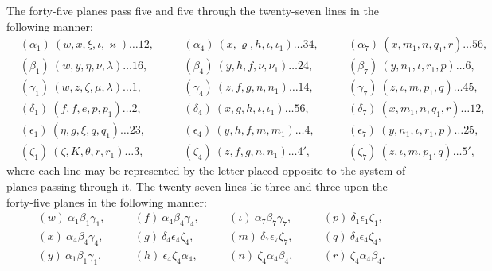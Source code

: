 \documentclass[11pt,a4paper]{book}
\begin{document}
The forty-five planes pass five and five through the twenty-seven lines in the following manner:
\begin{align*}
&(\alpha_{1})\ (w, x, \xi, \iota, \varkappa) \ldots 12, \quad &&(\alpha_{4})\ (x, \varrho, h, \iota, \iota_{1}) \ldots 34, \quad &&(\alpha_{7})\ (x, m_{1}, n, q_{1}, r) \ldots 56, \\
&(\beta_{1})\ (w, y, \eta, \nu, \lambda) \ldots 16, \quad &&(\beta_{4})\ (y, h, f, \nu, \nu_{1}) \ldots 24, \quad &&(\beta_{7})\ (y, n_{1}, \iota, r_{1}, p) \ldots 6, \\
&(\gamma_{1})\ (w, z, \zeta, \mu, \lambda) \ldots 1, \quad &&(\gamma_{4})\ (z, f, g, n, n_{1}) \ldots 14, \quad &&(\gamma_{7})\ (z, \iota, m, p_{1}, q) \ldots 45, \\
&(\delta_{1})\ (f, f, e, p, p_{1}) \ldots 2, \quad &&(\delta_{4})\ (x, g, h, \iota, \iota_{1}) \ldots 56, \quad &&(\delta_{7})\ (x, m_{1}, n, q_{1}, r) \ldots 12, \\
&(\epsilon_{1})\ (\eta, g, \xi, q, q_{1}) \ldots 23, \quad &&(\epsilon_{4})\ (y, h, f, m, m_{1}) \ldots 4, \quad &&(\epsilon_{7})\ (y, n_{1}, \iota, r_{1}, p) \ldots 25, \\
&(\zeta_{1})\ (\zeta, K, \theta, r, r_{1}) \ldots 3, \quad &&(\zeta_{4})\ (z, f, g, n, n_{1}) \ldots 4', \quad &&(\zeta_{7})\ (z, \iota, m, p_{1}, q) \ldots 5',
\end{align*}
where each line may be represented by the letter placed opposite to the system of planes passing through it. The twenty-seven lines lie three and three upon the forty-five planes in the following manner:
\begin{align*}
&(w)\ \alpha_{1}\beta_{1}\gamma_{1}, \quad &&(f)\ \alpha_{4}\beta_{4}\gamma_{4}, \quad &&(\iota)\ \alpha_{7}\beta_{7}\gamma_{7}, \quad &&(p)\ \delta_{1}\epsilon_{1}\zeta_{1}, \\
&(x)\ \alpha_{4}\beta_{4}\gamma_{4}, \quad &&(g)\ \delta_{4}\epsilon_{4}\zeta_{4}, \quad &&(m)\ \delta_{7}\epsilon_{7}\zeta_{7}, \quad &&(q)\ \delta_{4}\epsilon_{4}\zeta_{4}, \\
&(y)\ \alpha_{1}\beta_{1}\gamma_{1}, \quad &&(h)\ \epsilon_{4}\zeta_{4}\alpha_{4}, \quad &&(n)\ \zeta_{4}\alpha_{4}\beta_{4}, \quad &&(r)\ \zeta_{4}\alpha_{4}\beta_{4}.
\end{align*}

\newpage

\setcounter{page}{451}
\end{document}
